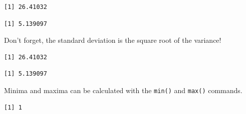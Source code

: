 \documentclass[
  letterpaper,
]{book}
\newenvironment{Shaded}{\begin{snugshade}}{\end{snugshade}}
\newcommand{\DecValTok}[1]{\textcolor[rgb]{0.68,0.00,0.00}{#1}}
\newcommand{\FunctionTok}[1]{\textcolor[rgb]{0.28,0.35,0.67}{#1}}
\newcommand{\NormalTok}[1]{\textcolor[rgb]{0.00,0.23,0.31}{#1}}
\newcommand{\SpecialCharTok}[1]{\textcolor[rgb]{0.37,0.37,0.37}{#1}}
\begin{document}
\begin{verbatim}
[1] 26.41032
\end{verbatim}

\begin{Shaded}
\end{Shaded}

\begin{verbatim}
[1] 5.139097
\end{verbatim}

Don't forget, the standard deviation is the square root of the variance!

\begin{Shaded}
\end{Shaded}

\begin{verbatim}
[1] 26.41032
\end{verbatim}

\begin{Shaded}
\end{Shaded}

\begin{verbatim}
[1] 5.139097
\end{verbatim}

Minima and maxima can be calculated with the \texttt{min()} and
\texttt{max()} commands.

\begin{Shaded}
\end{Shaded}

\begin{verbatim}
[1] 1
\end{verbatim}

\begin{Shaded}
\end{Shaded}
\end{document}
